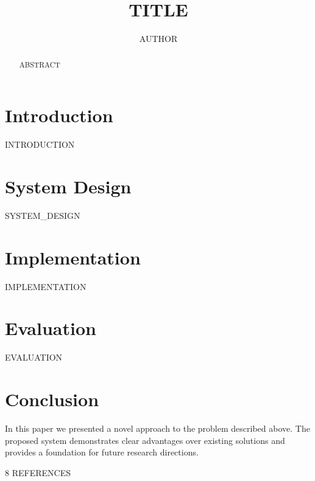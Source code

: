 \documentclass[runningheads]{llncs}
\begin{document}
\title{{{TITLE}}}

\author{{{AUTHOR}}}



\maketitle

\begin{abstract}
{{ABSTRACT}}
\end{abstract}

\section{Introduction}
{{INTRODUCTION}}

\section{System Design}
{{SYSTEM_DESIGN}}

\section{Implementation}
{{IMPLEMENTATION}}

\section{Evaluation}
{{EVALUATION}}

\section{Conclusion}
In this paper we presented a novel approach to the problem described above. The proposed system demonstrates clear advantages over existing solutions and provides a foundation for future research directions.

\begin{thebibliography}{8}
{{REFERENCES}}
\end{thebibliography}
\end{document}
